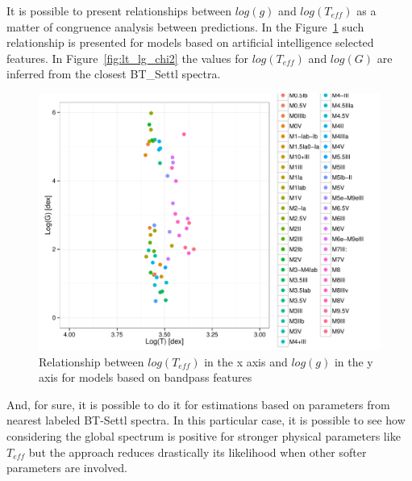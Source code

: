 {
It is possible to present relationships between $log(g)$ and $log(T_{eff})$
as a matter of congruence analysis between predictions. In the Figure~\ref{fig:lt_lg_ga}
such relationship is presented for models based on artificial intelligence selected features.
In Figure~\ref{fig:lt_lg_chi2} the values for $log(T_{eff})$ and $log(G)$ are 
inferred from the closest BT\_Settl spectra.

\begin{figure}
 \begin{center}
 \includegraphics[width=12cm]{figs/LT_LG_ga.pdf}
 \caption{Relationship between $log(T_{eff}) $ in the x axis 
 and $log(g)$ in the y axis for models based on bandpass features }
 \label{fig:lt_lg_ga}
 \end{center}
\end{figure}

And, for sure, it is possible to do it for estimations based on 
parameters from nearest labeled BT-Settl spectra.
In this particular case, it is possible to see how 
considering the global spectrum is positive for stronger 
physical parameters like $T_{eff}$ but the approach
reduces drastically its likelihood when other softer 
parameters are involved.

}
